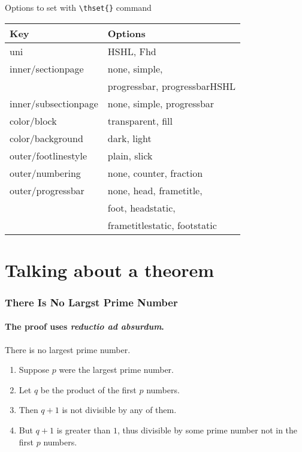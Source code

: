 \begin{frame}{Options to set with \texttt{\textbackslash thset\{\}} command  }
    \begin{table}[h]
        \centering
        \begin{tabular}{|l|l|}
            \hline
            \textbf{Key} & \textbf{Options} \\ 
            \hline
            uni & HSHL, Fhd \\ \hline
            inner/sectionpage & none, simple, \\&progressbar, progressbarHSHL \\ \hline
            inner/subsectionpage & none, simple, progressbar \\ \hline
            color/block & transparent, fill \\ \hline
            color/background & dark, light \\ \hline
            outer/footlinestyle & plain, slick \\ \hline
            outer/numbering & none, counter, fraction \\ \hline
            outer/progressbar & none, head, frametitle, \\& foot, headstatic, \\&frametitlestatic, footstatic \\ \hline
        \end{tabular}
       
    \end{table}
    \end{frame}
    
    \section[Example0]{Talking about a theorem}
    \begin{frame} 
    \frametitle{There Is No Largst Prime Number} 
    \framesubtitle{The proof uses \textit{reductio ad absurdum}.} 
    \begin{theorem}
    There is no largest prime number. \end{theorem} 
    \begin{enumerate} 
    \item<1-| alert@1> Suppose $p$ were the largest prime number. 
    \item<2-> Let $q$ be the product of the first $p$ numbers. 
    \item<3-> Then $q+1$ is not divisible by any of them. 
    \item<1-> But $q + 1$ is greater than $1$, thus divisible by some prime
    number not in the first $p$ numbers. 
    \end{enumerate}
    \end{frame}
  
    